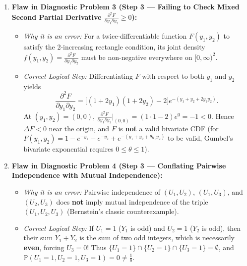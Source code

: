 \documentclass[11pt, letterpaper]{article}
\theoremstyle{definition}
\theoremstyle{remark}
\newcommand{\Prob}{\mathbb{P}}
\begin{document}
\begin{enumerate}[label=\textbf{Resolution \arabic*:}]
    \item \textbf{Flaw in Diagnostic Problem 3 (Step 3 --- Failing to Check Mixed Second Partial Derivative $\frac{\partial^2 F}{\partial y_1 \partial y_2} \ge 0$):}
    \begin{itemize}
        \item \emph{Why it is an error:} For a twice-differentiable function $F(y_1, y_2)$ to satisfy the 2-increasing rectangle condition, its joint density $f(y_1, y_2) = \frac{\partial^2 F}{\partial y_1 \partial y_2}$ must be non-negative everywhere on $[0, \infty)^2$.
        \item \emph{Correct Logical Step:} Differentiating $F$ with respect to both $y_1$ and $y_2$ yields
        \[
        \frac{\partial^2 F}{\partial y_1 \partial y_2} = \bigl[(1 + 2y_1)(1 + 2y_2) - 2\bigr] e^{-(y_1 + y_2 + 2y_1 y_2)}.
        \]
        At $(y_1, y_2) = (0, 0)$, $\frac{\partial^2 F}{\partial y_1 \partial y_2}\big|_{(0,0)} = (1 \cdot 1 - 2)e^0 = -1 < 0$. Hence $\Delta F < 0$ near the origin, and $F$ is \textbf{not} a valid bivariate CDF (for $F(y_1, y_2) = 1 - e^{-y_1} - e^{-y_2} + e^{-(y_1 + y_2 + \theta y_1 y_2)}$ to be valid, Gumbel's bivariate exponential requires $0 \le \theta \le 1$).
    \end{itemize}

    \item \textbf{Flaw in Diagnostic Problem 4 (Step 3 --- Conflating Pairwise Independence with Mutual Independence):}
    \begin{itemize}
        \item \emph{Why it is an error:} Pairwise independence of $(U_1, U_2)$, $(U_1, U_3)$, and $(U_2, U_3)$ does \textbf{not} imply mutual independence of the triple $(U_1, U_2, U_3)$ (Bernstein's classic counterexample).
        \item \emph{Correct Logical Step:} If $U_1 = 1$ ($Y_1$ is odd) and $U_2 = 1$ ($Y_2$ is odd), then their sum $Y_1 + Y_2$ is the sum of two odd integers, which is necessarily \textbf{even}, forcing $U_3 = 0$! Thus $\{U_1 = 1\} \cap \{U_2 = 1\} \cap \{U_3 = 1\} = \emptyset$, and $\Prob(U_1 = 1, U_2 = 1, U_3 = 1) = 0 \neq \frac{1}{8}$.
    \end{itemize}


\end{enumerate}
\end{document}
